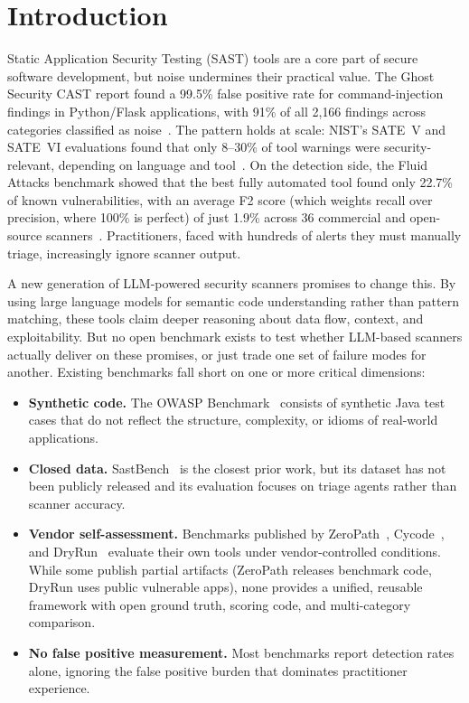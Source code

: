 \section{Introduction}

Static Application Security Testing (SAST) tools are a core part of secure
software development, but noise undermines their practical value.
The Ghost Security CAST report found a 99.5\% false positive rate for
command-injection findings in Python/Flask applications, with 91\% of all
2{,}166 findings across categories classified as noise~\cite{ghost2025cast}.
The pattern holds at scale: NIST's SATE~V and SATE~VI evaluations
found that only 8--30\% of tool warnings were security-relevant, depending on language and
tool~\cite{delaitre2018satev,delaitre2023satevi}. On the detection side,
the Fluid Attacks benchmark showed that the best fully automated tool found
only 22.7\% of known vulnerabilities, with an average F2 score (which weights recall over precision, where 100\% is perfect) of just 1.9\%
across 36 commercial and open-source scanners~\cite{fluidattacks2025}.
Practitioners, faced with hundreds of alerts they must manually triage,
increasingly ignore scanner output.

A new generation of LLM-powered security scanners promises to change this.
By using large language models for semantic code understanding rather than
pattern matching, these tools claim deeper reasoning about data flow, context,
and exploitability. But no open benchmark exists to test whether LLM-based
scanners actually deliver on these promises, or just trade one
set of failure modes for another. Existing benchmarks fall short on one or more
critical dimensions:

\begin{itemize}
  \item \textbf{Synthetic code.} The OWASP Benchmark~\cite{owaspbenchmark}
    consists of synthetic Java test cases that do not reflect the structure,
    complexity, or idioms of real-world applications.
  \item \textbf{Closed data.} SastBench~\cite{feiglin2026sastbench} is the
    closest prior work, but its dataset has not been publicly released
    and its evaluation focuses on triage agents rather than scanner accuracy.
  \item \textbf{Vendor self-assessment.} Benchmarks published by
    ZeroPath~\cite{zeropath2024}, Cycode~\cite{cycode2024benchmark}, and
    DryRun~\cite{dryrun2025sast} evaluate their own tools under vendor-controlled conditions. While some publish partial artifacts (ZeroPath releases benchmark code, DryRun uses public vulnerable apps), none provides a unified, reusable framework with open ground truth, scoring code, and multi-category comparison.
  \item \textbf{No false positive measurement.} Most benchmarks report
    detection rates alone, ignoring the false positive burden that dominates
    practitioner experience.
\end{itemize}

